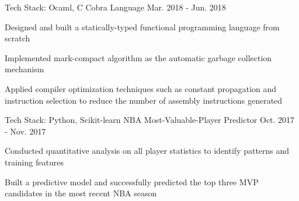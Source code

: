 

\begin{cventries}

\cventry
    {Tech Stack: Ocaml, C} %
    {Cobra Language} %
    {} %
    {Mar. 2018 - Jun. 2018} %
    {
      \begin{cvitems} %
        \item {Designed and built a statically-typed functional programming language from scratch}
        \item {Implemented mark-compact algorithm as the automatic garbage collection mechanism}
        \item {Applied compiler optimization techniques such as constant propagation and instruction selection to reduce the number of assembly instructions generated}
      \end{cvitems}
    }
   
\cventry
    {Tech Stack: Python, Scikit-learn} %
    {NBA Most-Valuable-Player Predictor} %
    {} %
    {Oct. 2017 - Nov. 2017} %
    {
      \begin{cvitems} %
        \item {Conducted quantitative analysis on all player statistics to identify patterns and training features}
        \item {Built a predictive model and successfully predicted the top three MVP candidates in the most recent NBA season}
% 
% 
      \end{cvitems}
    }

\end{cventries}
